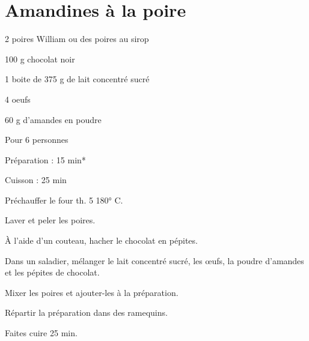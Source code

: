 \section[\normalsize{Amandines à la poire}]{Amandines à la poire}
\begin{ingredients}
\item 2 poires William ou des poires au sirop 
\item 100 g chocolat noir 
\item	1 boite de 375 g de lait concentr\'e sucr\'e
\item	4 oeufs
\item 60 g d’amandes en poudre 
\end{ingredients}
\begin{infos}
\item Pour 6 personnes
\item Préparation : 15 min*
\item Cuisson : 25 min
\end{infos}
\begin{etapes}
\item Pr\'echauffer le four th. 5 180° C.
\item Laver et peler les poires.
\item \`A l’aide d’un couteau, hacher le chocolat en p\'epites.
\item Dans un saladier, m\'elanger le lait concentr\'e sucr\'e, les œufs, la poudre d’amandes et les p\'epites de chocolat.
\item Mixer les poires et ajouter-les \`a la pr\'eparation.
\item R\'epartir la pr\'eparation dans des ramequins.
\item Faites cuire 25 min.
\end{etapes}
\begin{conseils}
\end{conseils}
